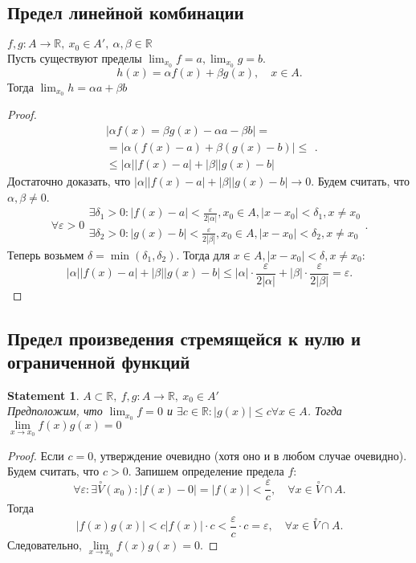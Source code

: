 \documentclass[11pt]{book}
\newcommand{\R}{\mathbb{R}}
\renewcommand{\le}{\leqslant}
\theoremstyle{definition}
\theoremstyle{plain}
\theoremstyle{plain}
\newtheorem*{st}{Statement}
\theoremstyle{definition}
\theoremstyle{remark}
\begin{document}
\subsection{Предел линейной комбинации}\label{ques_20}
\begin{thm}
    $f, g : A \to \R, ~x_0 \in A' , ~ \alpha , \beta \in \R$\\
    Пусть существуют пределы $\lim_{x_0} f = a, \lim_{x_0} g = b$. 
    \[
	h(x) = \alpha  f(x) +\beta g(x) , \quad x \in A
    .\] 
    Тогда $\lim_{x_0} h = \alpha a +\beta b$
\end{thm}
\begin{proof}
    \[
	\begin{array}{c}
	|\alpha f(x) =\beta g(x) -\alpha a -\beta b| =\\
	=|\alpha (f(x) -a) + \beta (g(x) -b)| \le \\
	\le |\alpha ||f(x) - a| + |\beta ||g(x) -b|
	\end{array}
    .\] 
    Достаточно доказать, что $
	|\alpha ||f(x) - a| + |\beta ||g(x) -b| \to  0
    $.  Будем считать, что $\alpha , \beta \ne 0$.
    \[
	\forall \varepsilon > 0
	\begin{array}{c}
	    \exists \delta_1 >0: |f(x) - a| < \frac{\varepsilon}{2|\alpha |}, x_0 \in A, |x-x_0|<\delta_1, x\ne x_0\\
	    \exists \delta_2 >0: |g(x) - b| < \frac{\varepsilon}{2|\beta |}, x_0 \in A, |x-x_0|<\delta_2 , x \ne x_0
    \end{array}
    .\] 
    Теперь возьмем $\delta = \min(\delta_1, \delta_2)$. Тогда для $x \in A, |x-x_0|<\delta , x\ne x_0:$ 
    \[
	|\alpha ||f(x) -a| +|\beta ||g(x)-b| \le |\alpha |\cdot \frac{\varepsilon}{2 |\alpha| } + |\beta |\cdot \frac{\varepsilon}{2 |\beta |} = \varepsilon 
    .\] 
\end{proof}
\subsection{Предел произведения стремящейся к нулю и ограниченной функций}\label{ques_21}
\begin{st}\label{lim_0_const}
    $A \subset \R, ~f, g: A \to \R, ~ x_0 \in A' $\\
    Предположим, что $\lim _{x_0} f = 0$ и $\exists c \in \R : |g(x)| \le  c \forall x \in A$. Тогда $\lim\limits_{x \to x_0} f(x)g(x) = 0$
\end{st}
\begin{proof}
    Если $c = 0$, утверждение очевидно (хотя оно и в любом случае очевидно).
    Будем считать, что $c >0$. Запишем определение предела $f$: \[
	\forall \varepsilon : \exists \stackrel \circ V(x_0) : |f(x) - 0| = |f(x)| < \frac{\varepsilon}{c}, \quad \forall x \in \stackrel \circ V \cap A
    .\] 
    Тогда \[
	|f(x)g(x)|< c |f(x)| \cdot c < \frac{\varepsilon}{c} \cdot c = \varepsilon , \quad \forall x \in \stackrel \circ V \cap A
    .\] 
    Следовательно,  $\lim\limits_{x \to x_0} f(x)g(x) = 0$.
\end{proof}
\end{document}
